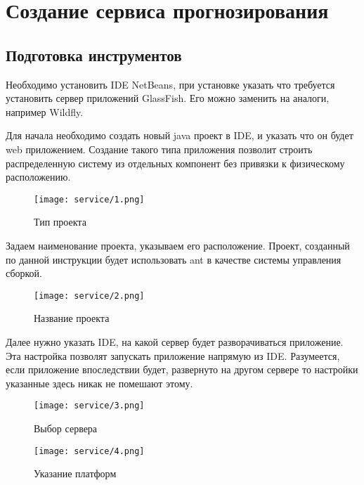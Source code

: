 \linespread{1.13}\selectfont

\chapter{Создание сервиса прогнозирования}
\section{Подготовка инструментов}
Необходимо установить IDE NetBeans, при установке указать что требуется установить сервер приложений GlassFish. Его можно заменить на аналоги, например Wildfly.  

Для начала необходимо создать новый java проект в IDE, и указать что он будет web приложением. Создание такого типа приложения позволит строить распределенную систему из отдельных компонент без привязки к физическому расположению. 

\begin{figure}[h!]
\center
	\texttt{[image: service/1.png]}
	\caption{Тип проекта}
	\label{pict:projecttype}
\end{figure}

Задаем наименование проекта, указываем его расположение. Проект, созданный по данной инструкции будет использовать ant в качестве системы управления сборкой. 

\begin{figure}[h!]
\center
	\texttt{[image: service/2.png]}
	\caption{Название проекта}
	\label{pict:projectname}
\end{figure}

Далее нужно указать IDE, на какой сервер будет разворачиваться приложение. Эта настройка позволят запускать приложение напрямую из IDE. Разумеется, если приложение впоследствии будет, развернуто на другом сервере то настройки указанные здесь никак не помешают этому.

\begin{figure}[h!]
\center
	\texttt{[image: service/3.png]}
	\caption{Выбор сервера}
	\label{pict:projectserver}
\end{figure}

\begin{figure}[h!]
\center
	\texttt{[image: service/4.png]}
	\caption{Указание платформ}
	\label{pict:projectlibs}
\end{figure}

